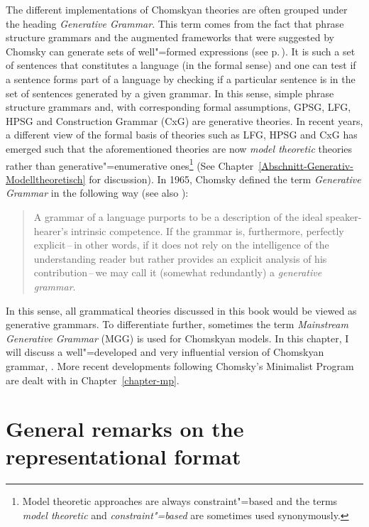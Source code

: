 The different implementations of Chomskyan theories are often grouped under the heading \emph{Generative Grammar}.
This term comes from the fact that phrase structure grammars and the augmented frameworks that were suggested by Chomsky can generate
sets of well"=formed expressions (see p.\,\pageref{Seite-generiert}). It is such a set of sentences that constitutes a language (in the formal
sense) and one can test if a sentence forms part of a language by checking if a particular sentence is in the set of sentences generated by a given grammar. In this sense, simple phrase structure grammars and, with corresponding formal assumptions, GPSG, LFG, 
HPSG and Construction Grammar (CxG) are generative theories.
In recent years, a different view of the formal basis of theories such as LFG, HPSG and CxG has
emerged such that the aforementioned theories are now \emph{model theoretic}
theories rather than generative"=enumerative ones\footnote{%
Model theoretic approaches are always constraint"=based and the terms \emph{model theoretic} and
\emph{constraint"=based} are 
sometimes used synonymously. 
} (See Chapter~\ref{Abschnitt-Generativ-Modelltheoretisch} for discussion). In 1965, Chomsky defined the term \emph{Generative Grammar}
in the following way (see also \citealp[]{Chomsky95a-u}):
\begin{quote}
A grammar of a language purports to be a description of the ideal speaker-hearer's intrinsic
competence. If the grammar is, furthermore, perfectly explicit\,--\,in other words, if it does not
rely on the intelligence of the understanding reader but rather provides an explicit analysis of
his contribution\,--\,we may call it (somewhat redundantly) a \emph{generative
  grammar}. \citep[]{Chomsky65a}
\end{quote}
In this sense, all grammatical theories discussed in this book would be viewed as generative grammars.
To differentiate further, sometimes the term \emph{Mainstream Generative Grammar} (MGG) is used \citep[]{CJ2005a} for Chomskyan models.
In this chapter, I will discuss a well"=developed and very influential version of Chomskyan
grammar, \gbt. More recent developments following Chomsky's Minimalist Program are dealt with in Chapter~\ref{chapter-mp}.

\section{General remarks on the representational format}
\label{Abschnitt-GB-allgemein}

